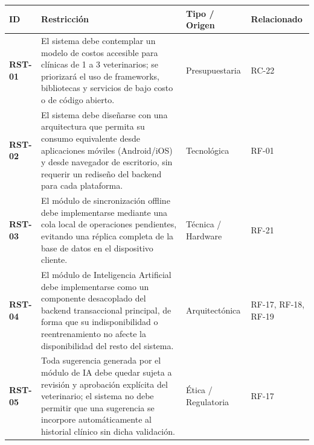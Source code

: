 \documentclass[
]{article}
\newcounter{none} %
\begin{document}
{\def\LTcaptype{none} %
\begin{longtable}[]{|
  >{\raggedright\arraybackslash}p{}|
  >{\raggedright\arraybackslash}p{}|
  >{\raggedright\arraybackslash}p{}|
  >{\raggedright\arraybackslash}p{}|}
\hline
\begin{minipage}[b]{\linewidth}\raggedright
\textbf{ID}
\end{minipage} & \begin{minipage}[b]{\linewidth}\raggedright
\textbf{Restricción}
\end{minipage} & \begin{minipage}[b]{\linewidth}\raggedright
\textbf{Tipo / Origen}
\end{minipage} & \begin{minipage}[b]{\linewidth}\raggedright
\textbf{Relacionado}
\end{minipage} \\
\hline
\endhead
\hline
\endlastfoot
\textbf{RST-01} & El sistema debe contemplar un modelo de costos accesible para clínicas de 1 a 3 veterinarios; se priorizará el uso de frameworks, bibliotecas y servicios de bajo costo o de código abierto. & Presupuestaria & RC-22 \\
\hline
\textbf{RST-02} & El sistema debe diseñarse con una arquitectura que permita su consumo equivalente desde aplicaciones móviles (Android/iOS) y desde navegador de escritorio, sin requerir un rediseño del backend para cada plataforma. & Tecnológica & RF-01 \\
\hline
\textbf{RST-03} & El módulo de sincronización offline debe implementarse mediante una cola local de operaciones pendientes, evitando una réplica completa de la base de datos en el dispositivo cliente. & Técnica / Hardware & RF-21 \\
\hline
\textbf{RST-04} & El módulo de Inteligencia Artificial debe implementarse como un componente desacoplado del backend transaccional principal, de forma que su indisponibilidad o reentrenamiento no afecte la disponibilidad del resto del sistema. & Arquitectónica & RF-17, RF-18, RF-19 \\
\hline
\textbf{RST-05} & Toda sugerencia generada por el módulo de IA debe quedar sujeta a revisión y aprobación explícita del veterinario; el sistema no debe permitir que una sugerencia se incorpore automáticamente al historial clínico sin dicha validación. & Ética / Regulatoria & RF-17 \\

\end{longtable}}
\end{document}

